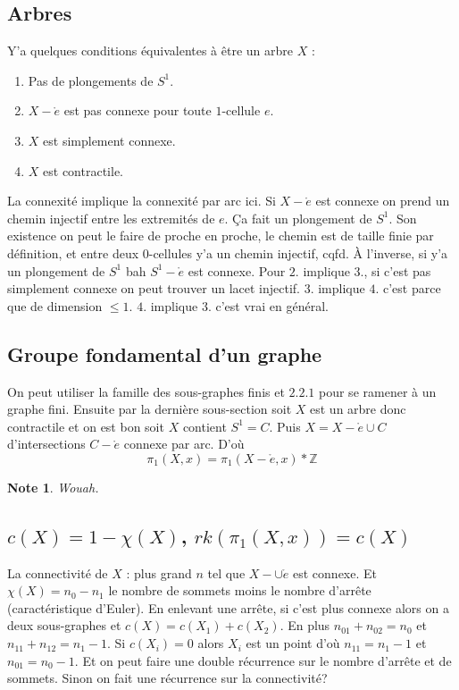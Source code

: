 \documentclass[a4paper,12pt]{book}
\newcommand{\Z}{\mathbb{Z}}
\theoremstyle{plain}
\newtheorem{note}{Note}
\theoremstyle{definition}
\theoremstyle{remark}
\begin{document}
\subsection{Arbres}
Y'a quelques conditions équivalentes à être un arbre $X$ :
\begin{enumerate}
  \item Pas de plongements de $S^1$.
  \item $X-\mathring e$ est pas connexe pour toute $1$-cellule $e$.
  \item $X$ est simplement connexe.
  \item $X$ est contractile.
\end{enumerate}
La connexité implique la connexité par arc ici. Si $X-\mathring e$
est connexe on prend un chemin injectif entre les extremités de 
$e$. Ça fait un plongement de $S^1$. Son existence on peut le
faire de proche en proche, le chemin est de taille finie par
définition, et entre deux $0$-cellules y'a un chemin injectif,
cqfd. À l'inverse, si y'a un plongement de $S^1$ bah 
$S^1-\mathring e$ est connexe. Pour $2.$ implique $3.$, si 
c'est pas simplement connexe on peut trouver un lacet injectif.
$3.$ implique $4.$ c'est parce que de dimension $\leq 1$. $4.$
implique $3.$ c'est vrai en général.

\subsection{Groupe fondamental d'un graphe}
On peut utiliser la famille des sous-graphes finis et $2.2.1$
pour se ramener à un graphe fini. Ensuite par la dernière 
sous-section soit $X$ est un arbre donc contractile et on est
bon soit $X$ contient $S^1=C$. Puis $X=X-\mathring e\cup C$
d'intersections $C-\mathring e$ connexe par arc. D'où
\[\pi_1(X,x)=\pi_1(X-\mathring e,x)*\Z\]
\begin{note}
  Wouah.
\end{note}

\subsection{$c(X)=1-\chi(X)$, $rk(\pi_1(X,x))=c(X)$}
La connectivité de $X$ : plus grand $n$ tel que 
$X-\cup \mathring e$ est connexe. Et $\chi(X)=n_0-n_1$ le
nombre de sommets moins le nombre d'arrête (caractéristique
d'Euler). En enlevant une arrête, si c'est plus connexe alors
on a deux sous-graphes et $c(X)=c(X_1)+c(X_2)$. En plus 
$n_{01}+n_{02}=n_0$ et $n_{11}+n_{12}=n_1-1$. Si $c(X_i)=0$ alors
$X_i$ est un point d'où $n_{11}=n_1-1$ et $n_{01}=n_0-1$. Et on
peut faire une double récurrence sur le nombre d'arrête et de
sommets. Sinon on fait une récurrence sur la connectivité?
\end{document}
